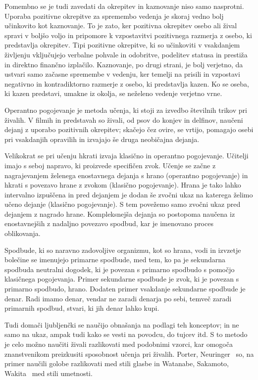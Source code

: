 \documentclass[a4paper, oneside, 12pt]{report}
\begin{document}
Pomembno se je tudi zavedati da okrepitev in kaznovanje niso samo nasprotni. Uporaba pozitivne okrepitve za spremembo vedenja je skoraj vedno bolj učinkovito kot kaznovanje. To je zato, ker pozitivna okrepitev osebo ali žival spravi v boljšo voljo in pripomore k vzpostavitvi pozitivnega razmerja z osebo, ki predstavlja okrepitev. Tipi pozitivne okrepitve, ki so učinkoviti v vsakdanjem življenju vključujejo verbalne pohvale in odobritve, podelitev statusa in prestiža in direktno finančno izplačilo. Kaznovanje, po drugi strani, je bolj verjetno, da ustvari samo začasne spremembe v vedenju, ker temelji na prisili in vzpostavi negativno in kontradiktorno razmerje z osebo, ki predstavlja kazen. Ko se oseba, ki kazen predstavi, umakne iz okolja, se neželeno vedenje verjetno vrne.~\cite{IntroductionToPsychology}

Operantno pogojevanje je metoda učenja, ki stoji za izvedbo številnih trikov pri živalih. V filmih in predstavah so živali, od psov do konjev in delfinov, naučeni dejanj z uporabo pozitivnih okrepitev; skačejo čez ovire, se vrtijo, pomagajo osebi pri vsakdanjih opravilih in izvajajo še druga neobičajna dejanja.~\cite{IntroductionToPsychology}

Velikokrat se pri učenju hkrati izvaja klasično in operantno pogojevanje. Učitelji imajo s seboj napravo, ki proizvede specifičen zvok. Učenje se začne z nagrajevanjem želenega enostavnega dejanja s hrano (operantno pogojevanje) in hkrati s povezavo hrane z zvokom (klasično pogojevanje). Hrana je tako lahko intervalno izpuščena in pred dejanjem je dodan še zvočni ukaz na katerega želimo učeno dejanje (klasično pogojevanje). S tem povežemo samo zvočni ukaz pred dejanjem z nagrado hrane. Kompleksnejša dejanja so postopoma naučena iz enostavnejših z nadaljno povezavo spodbud, kar je imenovano proces oblikovanja.~\cite{IntroductionToPsychology}

Spodbude, ki so naravno zadovoljive organizmu, kot so hrana, vodi in izvzetje bolečine se imenujejo primarne spodbude, med tem, ko pa je sekundarna spodbuda neutralni dogodek, ki je povezan s primarno spodbudo s pomočjo klasičnega pogojevanja. Primer sekundarne spodbude je zvok, ki je povezan s primarno spodbudo, hrano. Dodaten primer vsakdanje sekundarne spodbude je denar. Radi imamo denar, vendar ne zaradi denarja po sebi, temveč zaradi primarnih spodbud, stvari, ki jih denar lahko kupi.~\cite{IntroductionToPsychology}

Tudi domači ljubljenčki se naučijo obnašanja na podlagi teh konceptov; in ne samo na ukaz, ampak tudi kako se vesti na povodcu, do tujcev itd. S to metodo je celo možno naučiti živali razlikovati med podobnimi vzorci, kar omogoča znanstvenikom preizkusiti sposobnost učenja pri živalih. Porter, Neuringer~\cite{MusicDiscriminationByPigeons} so, na primer naučili golobe razlikovati med stili glasbe in Watanabe, Sakamoto, Wakita~\cite{PigeonsDiscriminationOfPaintings} med stili umetnosti.
\end{document}
